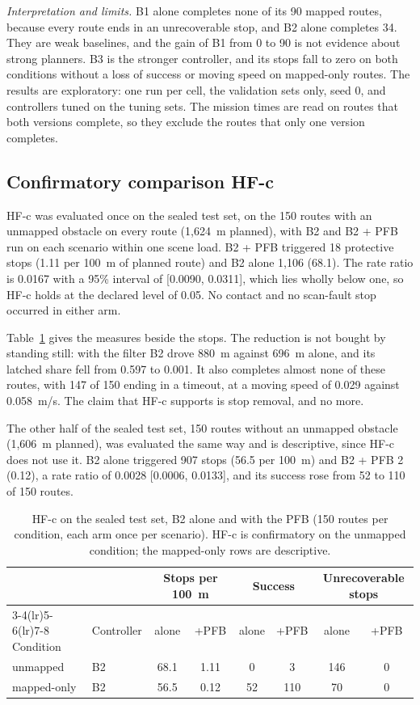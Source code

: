 \emph{Interpretation and limits.} B1 alone completes none of its 90 mapped routes, because every route ends in an unrecoverable stop, and B2 alone completes 34. They are weak baselines, and the gain of B1 from 0 to 90 is not evidence about strong planners. B3 is the stronger controller, and its stops fall to zero on both conditions without a loss of success or moving speed on mapped-only routes. The results are exploratory: one run per cell, the validation sets only, seed 0, and controllers tuned on the tuning sets. The mission times are read on routes that both versions complete, so they exclude the routes that only one version completes.

\subsection{Confirmatory comparison HF-c}

HF-c was evaluated once on the sealed test set, on the 150 routes with an unmapped obstacle on every route (1,624~m planned), with B2 and B2 + PFB run on each scenario within one scene load. B2 + PFB triggered 18 protective stops (1.11 per 100~m of planned route) and B2 alone 1,106 (68.1). The rate ratio is 0.0167 with a 95\% interval of [0.0090, 0.0311], which lies wholly below one, so HF-c holds at the declared level of 0.05. No contact and no scan-fault stop occurred in either arm.

Table~\ref{tab:hfc} gives the measures beside the stops. The reduction is not bought by standing still: with the filter B2 drove 880~m against 696~m alone, and its latched share fell from 0.597 to 0.001. It also completes almost none of these routes, with 147 of 150 ending in a timeout, at a moving speed of 0.029 against 0.058~m/s. The claim that HF-c supports is stop removal, and no more.

The other half of the sealed test set, 150 routes without an unmapped obstacle (1,606~m planned), was evaluated the same way and is descriptive, since HF-c does not use it. B2 alone triggered 907 stops (56.5 per 100~m) and B2 + PFB 2 (0.12), a rate ratio of 0.0028 [0.0006, 0.0133], and its success rose from 52 to 110 of 150 routes.

\begin{table}[t]
\caption{HF-c on the sealed test set, B2 alone and with the PFB (150 routes per condition, each arm once per scenario). HF-c is confirmatory on the unmapped condition; the mapped-only rows are descriptive.}
\label{tab:hfc}
\centering
\small
\setlength{\tabcolsep}{4pt}
\begin{tabular}{llcccccc}
\toprule
 & & \multicolumn{2}{c}{Stops per 100~m} & \multicolumn{2}{c}{Success} & \multicolumn{2}{c}{Unrecoverable stops} \\
\cmidrule(lr){3-4}\cmidrule(lr){5-6}\cmidrule(lr){7-8}
Condition & Controller & alone & +PFB & alone & +PFB & alone & +PFB \\
\midrule
unmapped & B2 & 68.1 & 1.11 & 0 & 3 & 146 & 0 \\
mapped-only & B2 & 56.5 & 0.12 & 52 & 110 & 70 & 0 \\
\bottomrule
\end{tabular}
\end{table}

